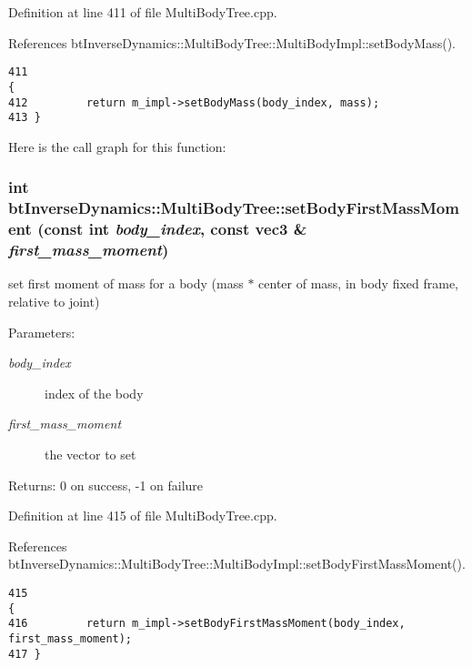 Definition at line 411 of file MultiBodyTree.cpp.

References btInverseDynamics::MultiBodyTree::MultiBodyImpl::setBodyMass().

\begin{Code}\begin{verbatim}411                                                                   {
412         return m_impl->setBodyMass(body_index, mass);
413 }
\end{verbatim}
\end{Code}




Here is the call graph for this function:\hypertarget{classbt_inverse_dynamics_1_1_multi_body_tree_5d8c853cf45160f049977e16175fa288}{
\subsubsection[setBodyFirstMassMoment]{\setlength{\rightskip}{0pt plus 5cm}int btInverseDynamics::MultiBodyTree::setBodyFirstMassMoment (const int {\em body\_\-index}, \/  const {\bf vec3} \& {\em first\_\-mass\_\-moment})}}
\label{classbt_inverse_dynamics_1_1_multi_body_tree_5d8c853cf45160f049977e16175fa288}


set first moment of mass for a body (mass $\ast$ center of mass, in body fixed frame, relative to joint) \begin{Desc}
\item[Parameters:]
\begin{description}
\item[{\em body\_\-index}]index of the body \item[{\em first\_\-mass\_\-moment}]the vector to set \end{description}
\end{Desc}
\begin{Desc}
\item[Returns:]0 on success, -1 on failure \end{Desc}


Definition at line 415 of file MultiBodyTree.cpp.

References btInverseDynamics::MultiBodyTree::MultiBodyImpl::setBodyFirstMassMoment().

\begin{Code}\begin{verbatim}415                                                                                              {
416         return m_impl->setBodyFirstMassMoment(body_index, first_mass_moment);
417 }
\end{verbatim}
\end{Code}




